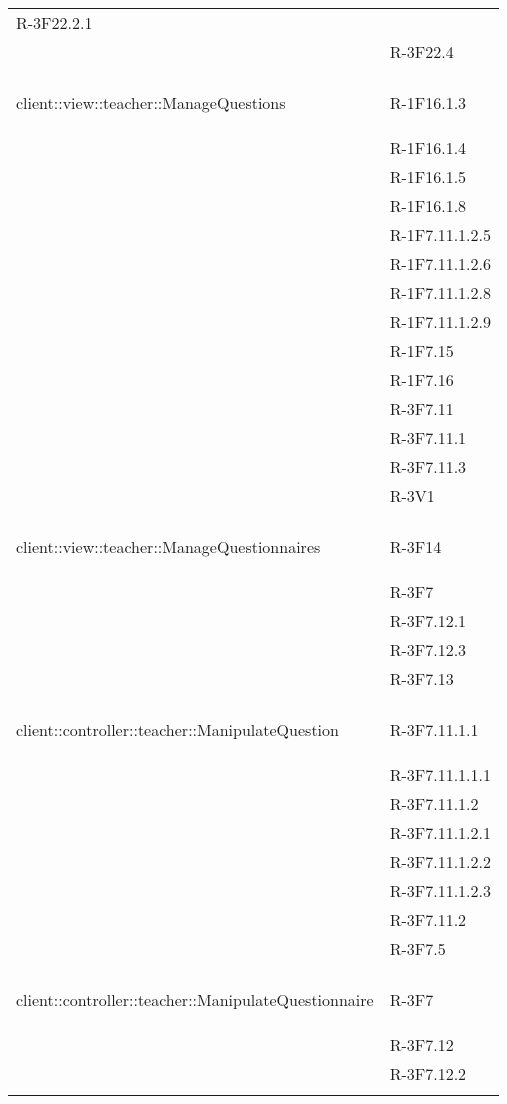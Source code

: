 \begin{longtable}{l p{3cm}}
	R-3F22.2.1 \tabularnewline &
	
	R-3F22.4 \tabularnewline &\tabularnewline
	\hline
	\hypertarget{client::view::teacher::ManageQuestions}{client::view::teacher::ManageQuestions} & R-1F16.1.3 \tabularnewline &
	
	R-1F16.1.4 \tabularnewline &
	
	R-1F16.1.5 \tabularnewline &
	
	R-1F16.1.8 \tabularnewline &
	
	R-1F7.11.1.2.5 \tabularnewline &
	
	R-1F7.11.1.2.6 \tabularnewline &
	
	R-1F7.11.1.2.8 \tabularnewline &
	
	R-1F7.11.1.2.9 \tabularnewline &
	
	R-1F7.15 \tabularnewline &
	
	R-1F7.16 \tabularnewline &
	
	R-3F7.11 \tabularnewline &
	
	R-3F7.11.1 \tabularnewline &
	
	R-3F7.11.3 \tabularnewline &
	
	R-3V1 \tabularnewline &\tabularnewline
	\hline
	\hypertarget{client::view::teacher::ManageQuestionnaires}{client::view::teacher::ManageQuestionnaires} & R-3F14 \tabularnewline &
	
	R-3F7 \tabularnewline &
	
	R-3F7.12.1 \tabularnewline &
	
	R-3F7.12.3 \tabularnewline &
	
	R-3F7.13 \tabularnewline &\tabularnewline
	\hline
	\hypertarget{client::controller::teacher::ManipulateQuestion}{client::controller::teacher::ManipulateQuestion} & R-3F7.11.1.1 \tabularnewline &
	
	R-3F7.11.1.1.1 \tabularnewline &
	
	R-3F7.11.1.2 \tabularnewline &
	
	R-3F7.11.1.2.1 \tabularnewline &
	
	R-3F7.11.1.2.2 \tabularnewline &
	
	R-3F7.11.1.2.3 \tabularnewline &
	
	R-3F7.11.2 \tabularnewline &
	
	R-3F7.5 \tabularnewline &\tabularnewline
	\hline
	\hypertarget{client::controller::teacher::ManipulateQuestionnaire}{client::controller::teacher::ManipulateQuestionnaire} & R-3F7 \tabularnewline &
	
	R-3F7.12 \tabularnewline &
	
	R-3F7.12.2 \tabularnewline &
	

\end{longtable}
